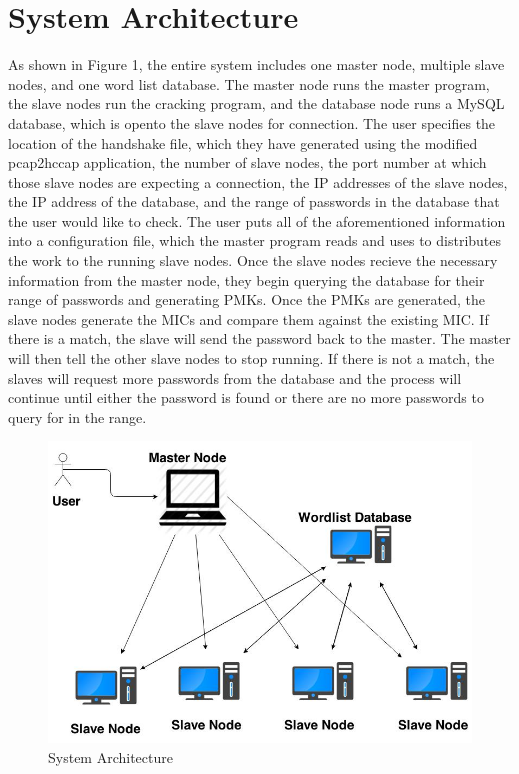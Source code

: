 \documentclass[12pt]{article}
\begin{document}


\section{System Architecture}
As shown in Figure 1, the entire system includes one master node, multiple slave nodes, and one word list database. The master node runs the master program, the slave nodes run the cracking program, and the database node runs a MySQL database, which is opento the slave nodes for connection. The user specifies the location of the handshake file, which they have generated using the modified pcap2hccap application, the number of slave nodes, the port number at which those slave nodes are expecting a connection, the IP addresses of the slave nodes, the IP address of the database, and the range of passwords in the database that the user would like to check. The user puts all of the aforementioned information into a configuration file, which the master program reads and uses to distributes the work to the running slave nodes. Once the slave nodes recieve the necessary information from the master node, they begin querying the database for their range of passwords and generating PMKs. Once the PMKs are generated, the slave nodes generate the MICs and compare them against the existing MIC. If there is a match, the slave will send the password back to the master. The master will then tell the other slave nodes to stop running. If there is not a match, the slaves will request more passwords from the database and the process will continue until either the password is found or there are no more passwords to query for in the range.
\begin{figure}[htbp]
\begin{center}
\includegraphics[width=120mm]{Senior_Project.jpg}
\end{center}
\caption{System Architecture}
\label{overflow}
\end{figure}
\end{document}

